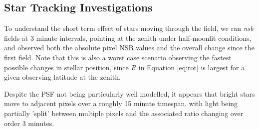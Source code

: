 \subsection{Star Tracking Investigations}

To understand the short term effect of stars moving through the field, we ran \textit{nsb} fields at 3 minute intervals, pointing at the zenith under half-moonlit conditions, and observed both the absolute pixel NSB values and the overall change since the first field. Note that this is also a worst case scenario observing the fastest possible changes in stellar position, since $R$ in Equation \ref{eq:rot} is largest for a given observing latitude at the zenith.

Despite the PSF not being particularly well modelled, it appears that bright stars move to adjacent pixels over a roughly 15 minute timespan, with light being partially 'split' between multiple pixels and the associated ratio changing over order 3 minutes.
